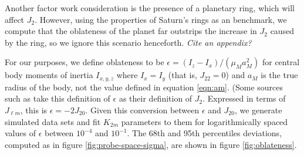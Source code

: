 \documentclass{aastex631}
\newcommand{\jtd}[1]{{\color{red}\textit{#1}}}
\begin{document}
Another factor work consideration is the presence of a planetary ring, which will affect $J_{2}$. However, using the properties of Saturn's rings as an benchmark, we compute that the oblateness of the planet far outstrips the increase in $J_{2}$ caused by the ring, so we ignore this scenario henceforth. \jtd{Cite an appendix?}

For our purposes, we define oblateness to be $\epsilon = (I_z - I_x)/(\mu_M a_M^2)$ for central body moments of inertia $I_{x,y,z}$ where $I_x = I_y$ (that is, $J_{22} = 0$) and $a_M$ is the true radius of the body, not the value defined in equation \ref{eqn:am}. (Some sources such as \cite{pater_lissauer_2015} take this definition of $\epsilon$ as their definition of $J_2$. Expressed in terms of $J_{\ell m}$, this is $\epsilon = -2J_{20}$. Given this conversion between $\epsilon$ and $J_{20}$, we generate simulated data sets and fit $K_{2m}$ parameters to them for logarithmically spaced values of $\epsilon$ between $10^{-4}$ and $10^{-1}$. The 68th and 95th percentiles deviations, computed as in figure \ref{fig:probe-space-sigma}, are shown in figure \ref{fig:oblateness}.
\end{document}
